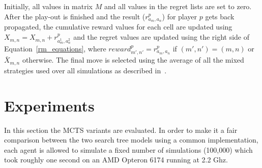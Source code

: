 \documentclass{article}
\begin{document}

Initially, all values in matrix $M$ and all values in the regret lists are set to zero. After the play-out is finished and the result ($r^{p}_{a_{m},a_{n}}$) for player $p$ gets back propagated, the cumulative reward values for each cell are updated using $X_{m,n} = X_{m,n} + r^{p}_{a^{1}_{m},a^{2}_{n}}$ and the regret values are updated using the right side of Equation~\ref{rm_equations},
where $reward^p_{m',n'} = r^p_{a_m,a_n}$ if $(m',n') = (m,n)$ or $\bar{X}_{m,n}$ otherwise.
The final move is selected using the average of all the mixed strategies used over all simulations as described in~\cite{mcts_goofspiel}. 




\section{Experiments}
\label{sec:experiments}

In this section the MCTS variants are evaluated. 
In order to make it a fair comparison between the two search tree models using a common implementation, each agent is allowed to simulate a fixed number of simulations (100,000) which took roughly one second on an AMD Opteron 6174 running at 2.2 Ghz.
\end{document}

